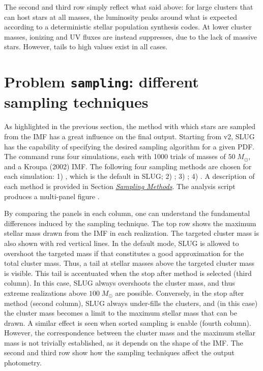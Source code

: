 \documentclass[letterpaper,10pt,english]{sphinxmanual}
\begin{document}
The second and third row simply reflect what said above: for large clusters that can host
stars at all masses, the luminosity peaks around what is expected according to a deterministic
stellar population synthesis codes. At lower cluster masses, ionizing and UV fluxes
are instead suppresses, due to the lack of massive stars. However, tails to high values exist
in all cases.


\section{Problem \texttt{sampling}: different sampling techniques}
\label{tests:problem-sampling-different-sampling-techniques}
As highlighted in the previous section, the method with which stars are sampled from the
IMF has a great influence on the final output. Starting from v2, SLUG has the capability of
specifying the desired sampling algorithm for a given PDF.
The command   runs four  simulations, each with 1000 trials
of masses of \(50\;M_\odot\), and a Kroupa (2002) IMF.
The following four sampling methods are chosen for each simulation: 1) ,
which is the default in SLUG; 2) ; 3) ; 4) .
A description of each method is provided in Section {\hyperref[pdfs:sampling\string-metod\string-label]{\emph{Sampling Methods}}}.
The analysis script  produces a multi-panel
figure .

By comparing the panels in each column, one can understand the fundamental differences
induced by the sampling technique. The top row shows the maximum stellar mass drawn from the
IMF in each realization. The targeted cluster mass is also shown with red vertical lines.
In the default mode, SLUG is allowed to overshoot the targeted mass if that constitutes
a good approximation for the total cluster mass. Thus, a tail at stellar masses above the
targeted cluster mass is visible. This tail is accentuated when the stop after method
is selected (third column). In this case, SLUG always overshoots the cluster mass, and thus
extreme realizations above \(100\;M_\odot\)  are possible. Conversely, in the
stop after method (second column), SLUG always under-fills the clusters, and (in this case)
the cluster mass becomes a limit to the maximum stellar mass that can be drawn. A similar effect
is seen when sorted sampling is enable (fourth column). However, the correspondence between the
cluster mass and the maximum stellar mass is not trivially established, as it depends on the
shape of the IMF. The second and third row show how the sampling techniques affect the output
photometry.
\end{document}
